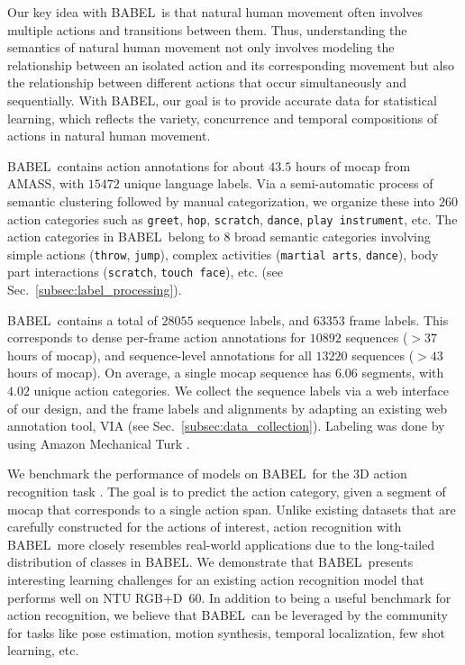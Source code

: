 \documentclass[final]{cvpr}
\def\babel{BABEL}
\def\ntu{NTU RGB+D}
\begin{document}
Our key idea with \babel~is that natural human movement often involves multiple actions and transitions between them. Thus, understanding the semantics of natural human movement not only involves modeling the relationship between an isolated action and its corresponding movement but also the relationship between different actions that occur simultaneously and sequentially. 
With \babel, our goal is to provide accurate data for statistical learning, which reflects the variety, concurrence and temporal compositions of actions in natural human movement. 

\babel~contains action annotations for about $43.5$ hours of mocap from AMASS, with $15472$ unique language labels. 
Via a semi-automatic process of semantic clustering followed by manual categorization, we organize these into $260$ action categories such as \texttt{greet}, \texttt{hop}, \texttt{scratch}, \texttt{dance}, \texttt{play instrument}, etc. 
The action categories in \babel~belong to 8 broad semantic categories involving simple actions (\texttt{throw}, \texttt{jump}), complex activities (\texttt{martial arts}, \texttt{dance}), body part interactions (\texttt{scratch}, \texttt{touch face}), etc. (see Sec.~\ref{subsec:label_processing}). 

\babel~contains a total of $28055$ sequence labels, and $63353$ frame labels. 
This corresponds to dense per-frame action annotations for $10892$ sequences ($>37$ hours of mocap), and sequence-level annotations for all $13220$ sequences ($>43$ hours of mocap). 
On average, a single mocap sequence has $6.06$ segments, with $4.02$ unique action categories. 
We collect the sequence labels via a web interface of our design, and the frame labels and alignments by adapting an existing web annotation tool, VIA \cite{dutta2019vgg} (see Sec.~\ref{subsec:data_collection}). 
Labeling was done by using Amazon Mechanical Turk \cite{amt}. 

We benchmark the performance of models on \babel~for the 3D action recognition task \cite{DBLP:conf/cvpr/ShahroudyLNW16}. 
The goal is to predict the action category, given a segment of mocap that corresponds to a single action span. 
Unlike existing datasets that are carefully constructed for the actions of interest, 
action recognition with \babel~more closely resembles real-world applications due to the long-tailed distribution of classes in \babel.
We demonstrate that \babel~presents interesting learning challenges for an existing action recognition model that performs well on \ntu~60. In addition to being a useful benchmark for action recognition, we believe that \babel~can be leveraged by the community for tasks like pose estimation, motion synthesis, temporal localization, few shot learning, etc. 
\end{document}
